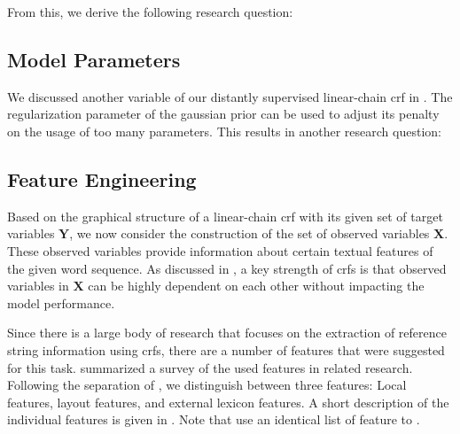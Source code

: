 From this, we derive the following research question:
\newcommand\researchquestionseven{}
\researchquestionseven%


\subsection{Model Parameters}\label{subsec:ae-model-parameters}

We discussed another variable of our distantly supervised \gls{linear-chain crf} in .
The regularization parameter of the \gls{gaussian prior} can be used to adjust its penalty on the usage of too many parameters.
This results in another research question:
\newcommand\researchquestioneight{}
\researchquestioneight%

\subsection{Feature Engineering}\label{subsec:ae-feature-engineering}

Based on the graphical structure of a \gls{linear-chain crf} with its given set of \glspl{target variable} $\mathbf{Y}$, we now consider the construction of the set of \glspl{observed variable} $\mathbf{X}$.
These \glspl{observed variable} provide information about certain textual features of the given word sequence.
As discussed in , a key strength of \glspl{crf} is that \glspl{observed variable} in $\mathbf{X}$ can be highly dependent on each other without impacting the model performance.

Since there is a large body of research that focuses on the extraction of reference string information using \glspl{crf}, there are a number of features that were suggested for this task.
 summarized a survey of the used features in related research.
Following the separation of \citet{peng2004accurate}, we distinguish between three features:
Local features, layout features, and external lexicon features.
A short description of the individual features is given in .
Note that \citet{wu2014citeseerx} use an identical list of feature to \citet{councill2008parscit}.

